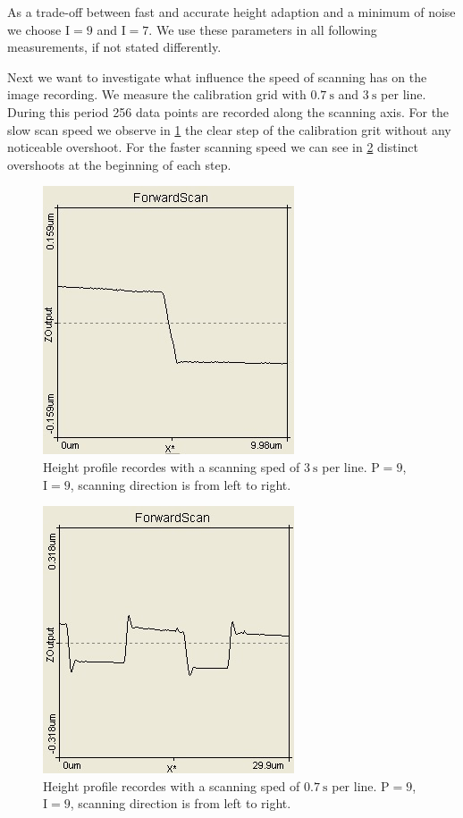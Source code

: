 \documentclass[paper=a4,fontsize=10pt,DIV=18,twocolumn,parskip=half]{scrartcl}
\numberwithin{equation}{section}    %
\begin{document}
As a trade-off between fast and accurate height adaption and a minimum of noise we choose $\mathrm{I}=9$ and $\mathrm{I}=7$. We use these parameters in all following measurements, if not stated differently.

Next we want to investigate what influence the speed of scanning has on the image recording. We measure the calibration grid with $\SI{0.7}{\second}$ and $\SI{3}{\second}$ per line. During this period 256 data points are recorded along the scanning axis. 
For the slow scan speed we observe in \ref{slow} the clear step of the calibration grit without any noticeable overshoot. For the faster scanning speed we can see in \ref{fast} distinct overshoots at the beginning of each step.

\begin{figure}[htp]
	\begin{center}
		\includegraphics[width=0.6\columnwidth]{Bilder/slow}
		\caption{Height profile recordes with a scanning sped of $\SI{3}{\second}$ per line. $\mathrm{P}=9$, $\mathrm{I}=9$, scanning direction is from left to right.}
		\label{slow}
	\end{center}
\end{figure}

\begin{figure}[htp]
	\begin{center}
		\includegraphics[width=0.6\columnwidth]{Bilder/fast}
		\caption{Height profile recordes with a scanning sped of $\SI{0.7}{\second}$ per line. $\mathrm{P}=9$, $\mathrm{I}=9$, scanning direction is from left to right.}
		\label{fast}
	\end{center}
\end{figure}
\end{document}
